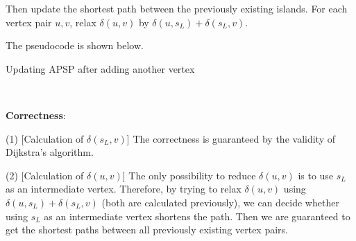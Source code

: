 \documentclass{article}
\begin{document}
Then update the shortest path between the previously existing islands. For each vertex pair $u,v$, relax $\delta(u,v)$ by $\delta(u,s_L)+\delta(s_L,v)$.

The pseudocode is shown below.
\begin{algorithm}
\caption{Updating APSP after adding another vertex}
\begin{algorithmic}[1]
{}
{}
		\EndIf
	\EndFor
\EndFor
\EndProcedure
\end{algorithmic}
\end{algorithm}

~

\noindent\textbf{Correctness}:

(1) [Calculation of $\delta(s_L,v)$] 
The correctness is guaranteed by the validity of Dijkstra's algorithm.

(2) [Calculation of $\delta(u,v)$] The only possibility to reduce $\delta(u,v)$ is to use $s_L$ as an intermediate vertex. Therefore, by trying to relax $\delta(u,v)$ using $\delta(u,s_L)+\delta(s_L,v)$ (both are calculated previously), we can decide whether using $s_L$ as an intermediate vertex shortens the path. Then we are guaranteed to get the shortest paths between all previously existing vertex pairs.
\end{document}
